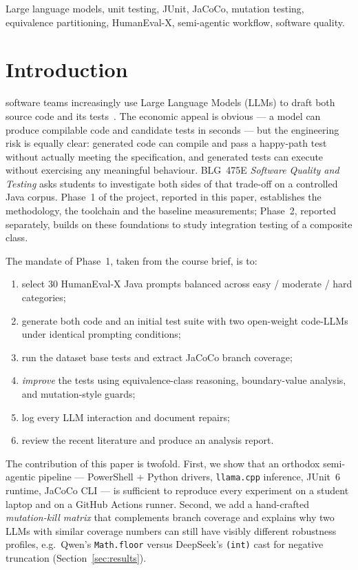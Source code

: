 \documentclass[journal]{IEEEtran}
\begin{document}
\begin{IEEEkeywords}
Large language models, unit testing, JUnit, JaCoCo, mutation testing,
equivalence partitioning, HumanEval-X, semi-agentic workflow, software
quality.
\end{IEEEkeywords}

\section{Introduction}\label{sec:intro}
 software teams increasingly use Large Language
Models (LLMs) to draft both source code and its
tests~\cite{chatunitest,metatestgen,lit_review}. The economic appeal is
obvious --- a model can produce compilable code and candidate tests in
seconds --- but the engineering risk is equally clear: generated code can
compile and pass a happy-path test without actually meeting the
specification, and generated tests can execute without exercising any
meaningful behaviour. BLG~475E \emph{Software Quality and Testing} asks
students to investigate both sides of that trade-off on a controlled Java
corpus. Phase~1 of the project, reported in this paper, establishes the
methodology, the toolchain and the baseline measurements; Phase~2,
reported separately, builds on these foundations to study integration
testing of a composite class.

The mandate of Phase~1, taken from the course brief, is to:
\begin{enumerate}
  \item select 30 HumanEval-X Java prompts balanced across easy /
    moderate / hard categories;
  \item generate both code and an initial test suite with two
    open-weight code-LLMs under identical prompting conditions;
  \item run the dataset base tests and extract JaCoCo branch coverage;
  \item \emph{improve} the tests using equivalence-class reasoning,
    boundary-value analysis, and mutation-style guards;
  \item log every LLM interaction and document repairs;
  \item review the recent literature and produce an analysis report.
\end{enumerate}

The contribution of this paper is twofold. First, we show that an orthodox
semi-agentic pipeline --- PowerShell + Python drivers, \texttt{llama.cpp}
inference, JUnit~6 runtime, JaCoCo CLI --- is sufficient to reproduce every
experiment on a student laptop and on a GitHub Actions runner. Second, we
add a hand-crafted \emph{mutation-kill matrix} that complements branch
coverage and explains why two LLMs with similar coverage numbers can still
have visibly different robustness profiles, e.g.\ Qwen's \texttt{Math.floor}
versus DeepSeek's \texttt{(int)} cast for negative truncation
(Section~\ref{sec:results}).
\end{document}
